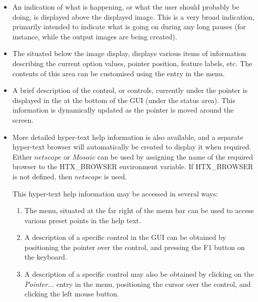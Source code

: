 \begin{itemize}

\item An indication of what is happening, or what the user should
probably be doing, is displayed above the displayed image. This is a very
broad indication, primarily intended to indicate what is going on during
any long pauses (for instance, while the output images are being
created).

\item The  situated below
the image display, displays various items of information describing the
current option values, pointer position, feature labels, etc. The
contents of this area can be customised using the  entry in the  menu.

\item A brief description of the control, or controls, currently under the
pointer is displayed in the  at the
bottom of the GUI (under the status area). This information is
dynamically updated as the pointer is moved around the screen.

\item More detailed hyper-text help information is also available, and a
separate hyper-text browser will automatically be created to display it
when required. Either $netscape$ or $Mosaic$ can be used by
assigning the name of the required browser to the HTX\_BROWSER
environment variable. If HTX\_BROWSER is not defined, then $netscape$
is used.

This hyper-text help information may be accessed in several ways:

\begin{enumerate}

\item The  menu, situated at the
far right of the menu bar can be used to access various preset points in
the help text.

\item A description of a specific control in the GUI can be obtained by 
positioning the pointer over the control, and pressing the F1
button on the keyboard.

\item A description of a specific control may also be obtained by clicking 
on the {\em Pointer...} entry in the  menu, positioning the cursor over the control,
and clicking the left mouse button. 

\end{enumerate}

\end{itemize}

